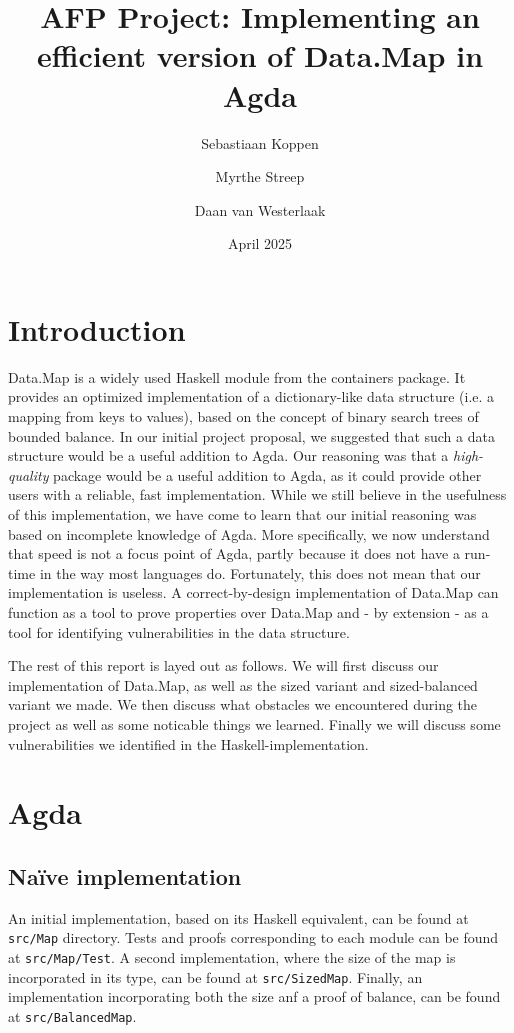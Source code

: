 \documentclass[a4paper,UKenglish,cleveref, autoref, thm-restate]{template/lipics-v2021}
\title{AFP Project: Implementing an efficient version of Data.Map in Agda}
\author{Sebastiaan Koppen}{Utrecht University, Netherlands}{}{}{}
\author{Myrthe Streep}{Utrecht University, Netherlands}{}{}{}
\author{Daan van Westerlaak}{Utrecht University, Netherlands}{}{}{}
\date{April 2025}
\begin{document}
\maketitle

\section*{Introduction}
Data.Map is a widely used Haskell module from the containers package. It provides an optimized implementation of a dictionary-like data structure (i.e. a mapping from keys to values), based on the concept of binary search trees of bounded balance. In our initial project proposal, we suggested that such a data structure would be a useful addition to Agda. Our reasoning was that a \textit{high-quality} package would be a useful addition to Agda, as it could provide other users with a reliable, fast implementation. While we still believe in the usefulness of this implementation, we have come to learn that our initial reasoning was based on incomplete knowledge of Agda. More specifically, we now understand that speed is not a focus point of Agda, partly because it does not have a run-time in the way most languages do. Fortunately, this does not mean that our implementation is useless. A correct-by-design implementation of Data.Map can function as a tool to prove properties over Data.Map and - by extension - as a tool for identifying vulnerabilities in the data structure.

The rest of this report is layed out as follows. We will first discuss our implementation of Data.Map, as well as the sized variant and sized-balanced variant we made. We then discuss what obstacles we encountered during the project as well as some noticable things we learned. Finally we will discuss some vulnerabilities we identified in the Haskell-implementation.


\section*{Agda}
\subsection*{Na\"ive implementation}
An initial implementation, based on its Haskell equivalent, can be found at \texttt{src/Map} directory. Tests and proofs corresponding to each module can be found at \texttt{src/Map/Test}. A second implementation, where the size of the map is incorporated in its type, can be found at \texttt{src/SizedMap}. Finally, an implementation incorporating both the size anf a proof of balance, can be found at \texttt{src/BalancedMap}.
\end{document}
